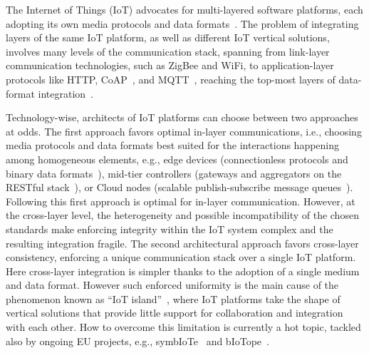 The Internet of Things (IoT) advocates for multi-layered software platforms,
each adopting its own media protocols and data
formats~\cite{GubbiBMP13,Atzori20102787,7123563}.
%
The problem of integrating layers of the same IoT platform, as well as
different IoT vertical solutions, involves many levels of the communication
stack, spanning from link-layer communication technologies, such as ZigBee and
WiFi, to application-layer protocols like HTTP,
CoAP~\cite{coap,doi:10.17487/RFC7252}, and MQTT~\cite{mqtt,mqtt-v3.1.1},
reaching the top-most layers of data-format
integration~\cite{Milenkovic:2015:CII:2843962.2822643}.

Technology-wise, architects of IoT platforms can choose between two approaches
at odds. The first approach favors optimal in-layer communications, i.e.,
choosing media protocols and data formats best suited for the interactions
happening among homogeneous elements, e.g., edge devices (connectionless
protocols and binary data formats~\cite{7123563}), mid-tier controllers
(gateways and aggregators on the RESTful stack~\cite{richardson2008restful}),
or Cloud nodes (scalable publish-subscribe message
queues~\cite{garg2013apache}). Following this first approach
is optimal for in-layer communication. However, at the cross-layer level, the heterogeneity
and possible incompatibility of the chosen standards make enforcing integrity
within the IoT system complex and the resulting integration fragile. The second architectural approach
favors cross-layer consistency, enforcing a unique communication stack over a
single IoT platform. Here cross-layer integration is simpler thanks to the
adoption of a single medium and data format. However such enforced uniformity is
the main cause of the phenomenon known as ``IoT
island''~\cite{Soursos16,Gojmerac16}, where IoT platforms take the shape of
vertical solutions that provide little support for collaboration and
integration with each other. How to overcome this limitation is currently a hot
topic, tackled also by ongoing EU projects, e.g., symbIoTe~\cite{Gojmerac16}
and bIoTope~\cite{biotope}.

